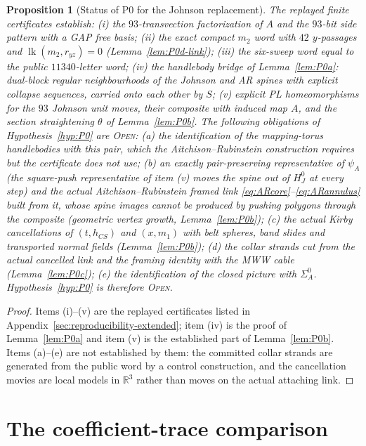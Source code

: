\documentclass[11pt]{amsart}
\newtheorem{proposition}[theorem]{Proposition}
\theoremstyle{definition}
\theoremstyle{remark}
\newcommand{\Open}{\textnormal{\textsc{Open}}}
\begin{document}
\begin{proposition}[Status of P0 for the Johnson replacement]\label{thm:P0discharge}
The replayed finite certificates establish: (i) the $93$-transvection
factorization of $A$ and the $93$-bit side pattern with a GAP free basis;
(ii) the exact compact $m_2$ word with $42$ $y$-passages and
$\operatorname{lk}(m_2,r_{yz})=0$ (Lemma~\ref{lem:P0d-link}); (iii) the
six-sweep word equal to the public $11340$-letter word; (iv) the
handlebody bridge of Lemma~\ref{lem:P0a}: dual-block regular
neighbourhoods of the Johnson and AR spines with explicit collapse
sequences, carried onto each other by $S$; (v) explicit PL homeomorphisms
for the $93$ Johnson unit moves, their composite with induced map $A$, and
the section straightening $\theta$ of Lemma~\ref{lem:P0b}.  The
following obligations of Hypothesis~\ref{hyp:P0} are \Open:
(a) the identification of the mapping-torus handlebodies with this pair,
which the Aitchison--Rubinstein construction requires but the certificate
does not use; (b) an exactly pair-preserving representative of $\psi_A$
(the square-push representative of item (v) moves the spine out of
$H_J^0$ at every step) and the actual Aitchison--Rubinstein framed
link \eqref{eq:ARcore}--\eqref{eq:ARannulus} built from it, whose spine
images cannot be produced by pushing polygons through the composite
(geometric vertex growth, Lemma~\ref{lem:P0b}); (c) the actual Kirby
cancellations of $(t,h_{CS})$ and $(x,m_1)$ with belt spheres, band slides
and transported normal fields (Lemma~\ref{lem:P0b}); (d) the collar strands
cut from the actual cancelled link and the framing identity with the MWW
cable (Lemma~\ref{lem:P0c}); (e) the identification of the closed picture
with $\Sigma_A^0$.  Hypothesis~\ref{hyp:P0} is therefore \Open.
\end{proposition}

\begin{proof}
Items (i)--(v) are the replayed certificates listed in
Appendix~\ref{sec:reproducibility-extended}; item (iv) is the proof of
Lemma~\ref{lem:P0a} and item (v) is the established part of
Lemma~\ref{lem:P0b}.  Items (a)--(e) are not established by them: the
committed collar strands are generated from the public word by a control
construction, and the cancellation movies are local models in
$\mathbb R^3$ rather than moves on the actual attaching link.
\end{proof}

\section{The coefficient-trace comparison}\label{sec:c-comparison}
\end{document}
